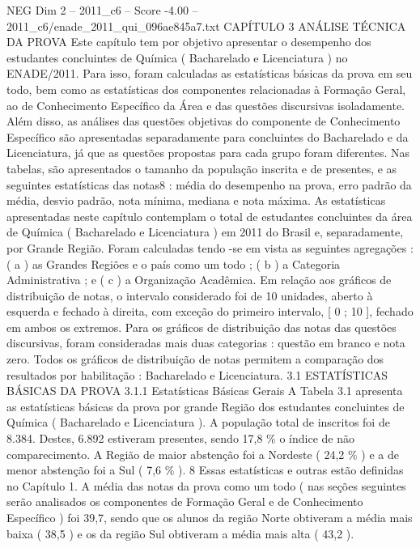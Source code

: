 \begin{textsample}{NEG Dim 2 – 2011\_c6 – Score -4.00 – 2011\_c6/enade\_2011\_qui\_096ae845a7.txt}  \label{ex:f2_neg_030}
CAPÍTULO 3 ANÁLISE TÉCNICA DA PROVA Este capítulo tem por objetivo apresentar o desempenho dos estudantes concluintes de Química ( Bacharelado e Licenciatura ) no ENADE/2011.
Para isso, foram calculadas as estatísticas básicas da prova em seu todo, bem como as estatísticas dos componentes relacionadas à Formação Geral, ao de Conhecimento Específico da Área e das questões discursivas isoladamente.
Além disso, as análises das questões objetivas do componente de Conhecimento Específico são apresentadas separadamente para concluintes do Bacharelado e da Licenciatura, já que as questões propostas para cada grupo foram diferentes.
Nas tabelas, são apresentados o tamanho da população inscrita e de presentes, e as seguintes estatísticas das notas8 : média do desempenho na prova, erro padrão da média, desvio padrão, nota mínima, mediana e nota máxima.
As estatísticas apresentadas neste capítulo contemplam o total de estudantes concluintes da área de Química ( Bacharelado e Licenciatura ) em 2011 do Brasil e, separadamente, por Grande Região.
Foram calculadas tendo -se em vista as seguintes agregações : ( a ) as Grandes Regiões e o país como um todo ; ( b ) a Categoria Administrativa ; e ( c ) a Organização Acadêmica.
Em relação aos gráficos de distribuição de notas, o intervalo considerado foi de 10 unidades, aberto à esquerda e fechado à direita, com exceção do primeiro intervalo, [ 0 ; 10 ], fechado em ambos os extremos.
Para os gráficos de distribuição das notas das questões discursivas, foram consideradas mais duas categorias : questão em branco e nota zero.
Todos os gráficos de distribuição de notas permitem a comparação dos resultados por habilitação : Bacharelado e Licenciatura. 3.1 ESTATÍSTICAS BÁSICAS DA PROVA 3.1.1 Estatísticas Básicas Gerais A Tabela 3.1 apresenta as estatísticas básicas da prova por grande Região dos estudantes concluintes de Química ( Bacharelado e Licenciatura ).
A população total de inscritos foi de 8.384.
Destes, 6.892 estiveram presentes, sendo 17,8 \% o índice de não comparecimento.
A Região de maior abstenção foi a Nordeste ( 24,2 \% ) e a de menor abstenção foi a Sul ( 7,6 \% ). 8 Essas estatísticas e outras estão definidas no Capítulo 1.
A média das notas da prova como um todo ( nas seções seguintes serão analisados os componentes de Formação Geral e de Conhecimento Específico ) foi 39,7, sendo que os alunos da região Norte obtiveram a média mais baixa ( 38,5 ) e os da região Sul obtiveram a média mais alta ( 43,2 ).

\end{textsample}
